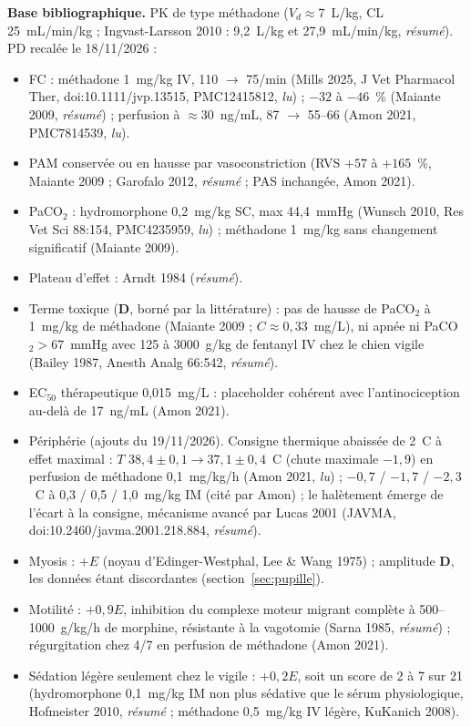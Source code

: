 \documentclass[10pt,a4paper]{article}
\newcommand{\vp}[1]{\text{\texttt{\detokenize{#1}}}}
\newcommand{\evD}{\textcolor{red!70!black}{\textbf{D}}}
\newcommand{\acc}[1]{\textsl{#1}}
\newcommand{\sources}[1]{\par\textbf{Base bibliographique.} #1}
\begin{document}
\sources{
PK de type méthadone ($V_d \approx 7$~L/kg, CL 25~mL/min/kg ; Ingvast-Larsson 2010 : 9,2~L/kg et 27,9~mL/min/kg, \acc{résumé}). PD recalée le 18/11/2026 :
\begin{itemize}
\item FC : méthadone 1~mg/kg IV, 110 $\to$ 75/min (Mills 2025, J Vet Pharmacol Ther, doi:10.1111/jvp.13515, PMC12415812, \acc{lu}) ; $-32$ à $-46$~\% (Maiante 2009, \acc{résumé}) ; perfusion à $\approx 30$~ng/mL, 87 $\to$ 55--66 (Amon 2021, PMC7814539, \acc{lu}).
\item PAM conservée ou en hausse par vasoconstriction (RVS $+57$ à $+165$~\%, Maiante 2009 ; Garofalo 2012, \acc{résumé} ; PAS inchangée, Amon 2021).
\item PaCO$_2$ : hydromorphone 0,2~mg/kg SC, max 44,4~mmHg (Wunsch 2010, Res Vet Sci 88:154, PMC4235959, \acc{lu}) ; méthadone 1~mg/kg sans changement significatif (Maiante 2009).
\item Plateau d'effet : Arndt 1984 (\acc{résumé}).
\item Terme toxique (\evD{}, borné par la littérature) : pas de hausse de PaCO$_2$ à 1~mg/kg de méthadone (Maiante 2009 ; $C \approx 0{,}33$~mg/L), ni apnée ni PaCO$_2 > 67$~mmHg avec 125 à 3000~\textmu g/kg de fentanyl IV chez le chien vigile (Bailey 1987, Anesth Analg 66:542, \acc{résumé}).
\item EC$_{50}$ thérapeutique 0,015~mg/L : placeholder cohérent avec l'antinociception au-delà de 17~ng/mL (Amon 2021).
\item Périphérie (ajouts du 19/11/2026). Consigne thermique abaissée de 2~\degre C à effet maximal : $T$ $38{,}4 \pm 0{,}1 \to 37{,}1 \pm 0{,}4$~\degre C (chute maximale $-1{,}9$) en perfusion de méthadone 0,1~mg/kg/h (Amon 2021, \acc{lu}) ; $-0{,}7$ / $-1{,}7$ / $-2{,}3$~\degre C à 0,3 / 0,5 / 1,0~mg/kg IM (cité par Amon) ; le halètement émerge de l'écart à la consigne, mécanisme avancé par Lucas 2001 (JAVMA, doi:10.2460/javma.2001.218.884, \acc{résumé}).
\item Myosis : \vp{pupil_ew} $+ E$ (noyau d'Edinger-Westphal, Lee \& Wang 1975) ; amplitude \evD{}, les données étant discordantes (section~\ref{sec:pupille}).
\item Motilité : \vp{gi_inhib} $+ 0{,}9E$, inhibition du complexe moteur migrant complète à 500--1000~\textmu g/kg/h de morphine, résistante à la vagotomie (Sarna 1985, \acc{résumé}) ; régurgitation chez 4/7 en perfusion de méthadone (Amon 2021).
\item Sédation légère seulement chez le vigile : \vp{sedation} $+ 0{,}2E$, soit un score de 2 à 7 sur 21 (hydromorphone 0,1~mg/kg IM non plus sédative que le sérum physiologique, Hofmeister 2010, \acc{résumé} ; méthadone 0,5~mg/kg IV légère, KuKanich 2008).
\end{itemize}}
\end{document}
